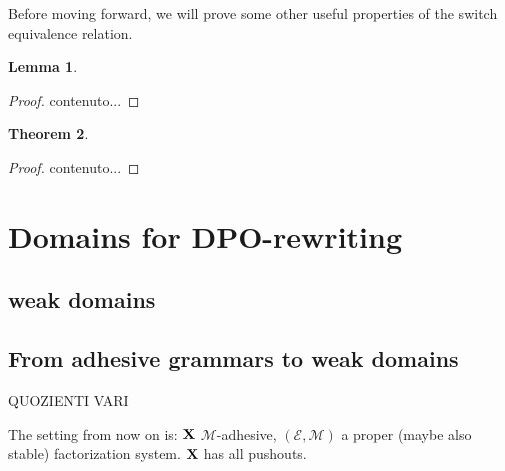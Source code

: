 \documentclass[a4paper]{article}
\def\X{\textbf {\textup{X}}}
\newtheorem{theorem}{Theorem}[section]
\newtheorem{lemma}[theorem]{Lemma}
\theoremstyle{definition}
\begin{document}
Before moving forward, we will prove some other useful properties of the switch equivalence relation.

\begin{lemma}
\end{lemma}
\begin{proof}
	contenuto...
\end{proof}


\begin{theorem}
\end{theorem}
\begin{proof}
	contenuto...
\end{proof}


\section{ Domains for DPO-rewriting}

\subsection{weak domains}

\subsection{From adhesive grammars to weak domains}

\newpage
QUOZIENTI VARI

The setting from now on is: $\X$ $\mathcal{M}$-adhesive, $(\mathcal{E}, \mathcal{M})$ a proper (maybe also stable) factorization system. $\X$ has all pushouts.
\end{document}
